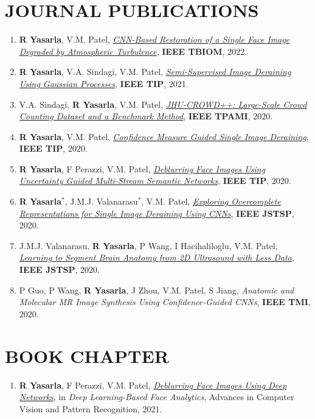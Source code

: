 \documentclass[margin,11pt]{resume}
\begin{document}
\section{\footnotesize {\large J}OURNAL {\large P}UBLICATIONS}
\begin{enumerate}[leftmargin=*,itemsep=0pt,topsep=2pt]
    \item \textbf{R Yasarla}, V.M. Patel, \textit{\href{https://arxiv.org/pdf/2007.08404.pdf?ref=https://githubhelp.com}{CNN-Based Restoration of a Single Face Image Degraded by Atmospheric Turbulence}}, \textbf{IEEE TBIOM}, 2022.
    \item \textbf{R Yasarla}, V.A. Sindagi, V.M. Patel, \textit{\href{https://ieeexplore.ieee.org/stamp/stamp.jsp?tp=&arnumber=9489290}{Semi-Supervised Image Deraining Using Gaussian Processes}}, \textbf{IEEE TIP}, 2021.
    \item V.A. Sindagi, \textbf{R Yasarla}, V.M. Patel, \textit{\href{https://ieeexplore.ieee.org/abstract/document/9248596}{JHU-CROWD++: Large-Scale Crowd Counting Dataset and a Benchmark Method}}, \textbf{IEEE TPAMI}, 2020.
    \item \textbf{R Yasarla}, V.M. Patel, \textit{\href{https://arxiv.org/pdf/1909.04207.pdf}{Confidence Measure Guided Single Image Deraining}}, \textbf{IEEE TIP}, 2020.
    \item \textbf{R Yasarla}, F Perazzi, V.M. Patel, \textit{\href{https://arxiv.org/pdf/1907.13106.pdf}{Deblurring Face Images Using Uncertainty Guided Multi-Stream Semantic Networks}}, \textbf{IEEE TIP}, 2020.
    \item \textbf{R Yasarla$^{*}$}, J.M.J. Valanarasu$^{*}$, V.M. Patel, \textit{\href{https://arxiv.org/pdf/2010.10661.pdf}{Exploring Overcomplete Representations for Single Image Deraining Using CNNs}}, \textbf{IEEE JSTSP}, 2020.
    \item J.M.J. Valanarasu, \textbf{R Yasarla}, P Wang, I Hacihaliloglu, V.M. Patel, \textit{\href{https://ieeexplore.ieee.org/abstract/document/9113237}{Learning to Segment Brain Anatomy from 2D Ultrasound with Less Data}}, \textbf{IEEE JSTSP}, 2020.
    \item P Guo, P Wang, \textbf{R Yasarla}, J Zhou, V.M. Patel, S Jiang, \textit{Anatomic and Molecular MR Image Synthesis Using Confidence-Guided CNNs}, \textbf{IEEE TMI}, 2020.
\end{enumerate}

\vspace{-0.8em}
\section{\footnotesize {\large B}OOK {\large C}HAPTER}
\begin{enumerate}[leftmargin=*,itemsep=0pt,topsep=2pt]
    \item \textbf{R Yasarla}, F Perazzi, V.M. Patel, \textit{\href{https://link.springer.com/chapter/10.1007/978-3-030-74697-1_5}{Deblurring Face Images Using Deep Networks}}, in \textit{Deep Learning-Based Face Analytics}, Advances in Computer Vision and Pattern Recognition, 2021.
\end{enumerate}
\end{document}

